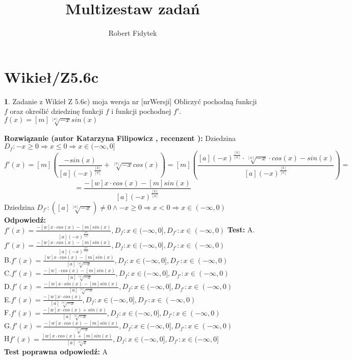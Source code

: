 \documentclass[12pt, a4paper]{article}
\title{Multizestaw zadań}
\author{Robert Fidytek}
\date{}
\theoremstyle{definition} %
\newtheorem{zad}{}
\newcommand{\kategoria}[1]{\section{#1}} %
\newcommand{\zadStart}[1]{\begin{zad}#1\newline} %
\newcommand{\zadStop}{\end{zad}}   %
\newcommand{\rozwStart}[2]{\noindent \textbf{Rozwiązanie (autor #1 , recenzent #2): }\newline} %
\newcommand{\rozwStop}{\newline}                                            %
\newcommand{\odpStart}{\noindent \textbf{Odpowiedź:}\newline}    %
\newcommand{\odpStop}{\newline}                                             %
\newcommand{\testStart}{\noindent \textbf{Test:}\newline} %
\newcommand{\testStop}{\newline} %
\newcommand{\kluczStart}{\noindent \textbf{Test poprawna odpowiedź:}\newline} %
\newcommand{\kluczStop}{\newline} %
\begin{document}
\maketitle


\kategoria{Wikieł/Z5.6c}
\zadStart{Zadanie z Wikieł Z 5.6c) moja wersja nr [nrWersji]}
Obliczyć pochodną funkcji $f$ oraz określić dziedzinę funkcji $f$ i funkcji pochodnej $f'$.\\
$f(x)=[m]\sqrt[[a]]{-x}sin(x)$
\zadStop
\rozwStart{Katarzyna Filipowicz}{}
Dziedzina $D_f: -x \geq 0 \Rightarrow x\leq 0 \Rightarrow x \in (-\infty,0]$
$$
f'(x)=[m]\left(\frac{-sin(x)}{[a](-x)^{\frac{[k]}{[a]}}}+\sqrt[[a]]{-x}cos(x)\right)=[m]\left(\frac{[a](-x)^{\frac{[k]}{[a]}}\cdot \sqrt[[a]]{-x} \cdot cos(x)-sin(x)}{[a](-x)^{\frac{[k]}{[a]}}}\right)=
$$  $$
=\frac{-[w] x\cdot cos(x)-[m]sin(x)}{[a](-x)^{\frac{[k]}{[a]}}}
$$
Dziedzina $D_{f'}: ([a]\sqrt[[a]]{-x}) \neq 0 \wedge -x\geq 0 \Rightarrow x < 0 \Rightarrow   x \in (-\infty,0)$
\rozwStop
\odpStart
$f'(x)=\frac{-[w] x\cdot cos(x)-[m]sin(x)}{[a](-x)^{\frac{[k]}{[a]}}}, D_f:x \in (-\infty,0], D_{f'}:x \in (-\infty,0)$
\odpStop
\testStart
A.$f'(x)=\frac{-[w] x\cdot cos(x)-[m]sin(x)}{[a](-x)^{\frac{[k]}{[a]}}}, D_f:x \in (-\infty,0], D_{f'}:x \in (-\infty,0)$\\
B.$f'(x)=\frac{[w] x\cdot cos(x)-[m]sin(x)}{[a]\sqrt[[a]]{-x}}, D_f:x \in (-\infty,0], D_{f'}:x \in (-\infty,0)$\\
C.$f'(x)=\frac{-[w]\cdot cos(x)-[m]sin(x)}{[a]\sqrt[[a]]{-x}}, D_f:x \in (-\infty,0], D_{f'}:x \in (-\infty,0)$\\
D.$f'(x)=\frac{-[w] x\cdot sin(x)-[m]sin(x)}{[a]\sqrt[[a]]{-x}}, D_f:x \in (-\infty,0], D_{f'}:x \in (-\infty,0)$\\
E.$f'(x)=\frac{-[w] x\cdot cos(x)}{[a]\sqrt[[a]]{-x}}, D_f:x \in (-\infty,0], D_{f'}:x \in (-\infty,0)$\\
F.$f'(x)=\frac{-[w] x\cdot cos(x)+sin(x)}{[a]\sqrt[[a]]{-x}}, D_f:x \in (-\infty,0], D_{f'}:x \in (-\infty,0)$\\
G.$f'(x)=\frac{-[w] x\cdot cos(x)-[m]sin(x)}{\sqrt[[a]]{-x}}, D_f:x \in (-\infty,0], D_{f'}:x \in (-\infty,0)$\\
H$f'(x)=\frac{[w] x\cdot cos(x)+[m]sin(x)}{[a]\sqrt[[a]]{x}}, D_f:x \in (-\infty,0], D_{f'}:x \in (-\infty,0]$\\
\testStop
\kluczStart
A
\kluczStop
\end{document}
